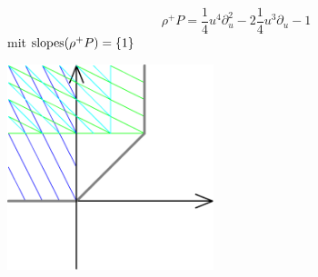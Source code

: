 \begin{minipage}[hbt]{0,39\textwidth}
  \[ \rho^+P= \frac{1}{4}u^4\partial_u^2 -2\frac{1}{4}u^3\partial_u-1 \]
  mit $ \operatorname{slopes}(\rho^+P)=\{1\} $
\end{minipage}
\begin{minipage}[hbt]{0,59\textwidth}
  \begin{center}
    \includegraphics[width=6cm]{img/formal_b_pb.png}
  \end{center}
\end{minipage}

